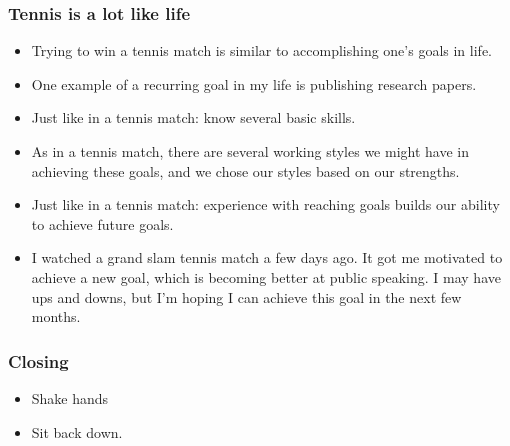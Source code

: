 \begin{frame}
\frametitle{Tennis is a lot like life}
\begin{itemize}
\item \small Trying to win a tennis match is similar to accomplishing one's goals in life.
\item \small One example of a recurring goal in my life is publishing research papers.
\item \small Just like in a tennis match: know several basic skills.

\item \small As in a tennis match, there are several working styles we might have in achieving these goals, and we chose our styles based on our strengths.
\item \small Just like in a tennis match: experience with reaching goals
builds our ability to achieve future goals.

\item \small I watched a grand slam tennis match a few days ago. It got me motivated to achieve
a new goal, which is becoming better at public speaking. I may have ups and downs, but
I'm hoping I can achieve this goal in the next few months.
\end{itemize}
\end{frame}

\begin{frame}
\frametitle{Closing}
\begin{itemize}
\item Shake hands
\item Sit back down.
\end{itemize}
\end{frame}

